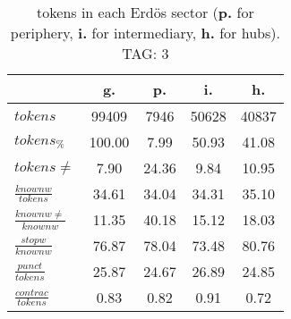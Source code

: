\begin{table}[h!]
\begin{center}
\begin{tabular}{| l | c | c | c | c |}\hline
 & g. & p. & i. & h. \\\hline
$tokens$ & 99409  & 7946  & 50628  & 40837 \\\hline
$tokens_{\%}$ & 100.00  & 7.99  & 50.93  & 41.08 \\\hline
$tokens \neq$ & 7.90  & 24.36  & 9.84  & 10.95 \\\hline
$\frac{knownw}{tokens}$ & 34.61  & 34.04  & 34.31  & 35.10 \\\hline
$\frac{knownw \neq}{knownw}$ & 11.35  & 40.18  & 15.12  & 18.03 \\\hline
$\frac{stopw}{knownw}$ & 76.87  & 78.04  & 73.48  & 80.76 \\\hline
$\frac{punct}{tokens}$ & 25.87  & 24.67  & 26.89  & 24.85 \\\hline
$\frac{contrac}{tokens}$ & 0.83  & 0.82  & 0.91  & 0.72 \\\hline
\end{tabular}
\caption{tokens in each Erd\"os sector ({{\bf p.}} for periphery, {{\bf i.}} for intermediary, 
    {{\bf h.}} for hubs). TAG: 3}
\end{center}
\end{table}